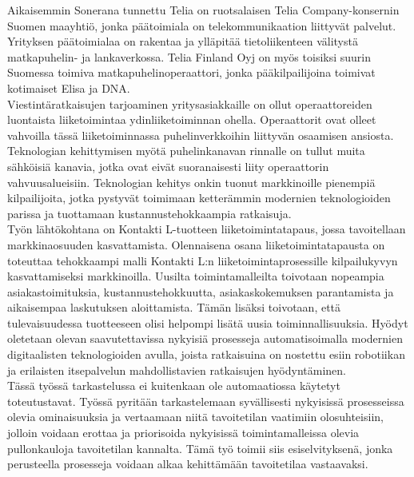 \documentclass[finnish,12pt,a4paper,pdftex]{article}
\begin{document}
Aikaisemmin Sonerana tunnettu Telia on ruotsalaisen Telia Company-konsernin Suomen maayhtiö, jonka päätoimiala on telekommunikaation liittyvät palvelut. Yrityksen päätoimialaa on rakentaa ja ylläpitää tietoliikenteen välitystä matkapuhelin- ja lankaverkossa. Telia Finland Oyj on myös toisiksi suurin Suomessa toimiva matkapuhelinoperaattori, jonka pääkilpailijoina toimivat kotimaiset Elisa ja DNA.\\

Viestintäratkaisujen tarjoaminen yritysasiakkaille on ollut operaattoreiden luontaista liiketoimintaa ydinliiketoiminnan ohella. Operaattorit ovat olleet vahvoilla tässä liiketoiminnassa puhelinverkkoihin liittyvän osaamisen ansiosta. Teknologian kehittymisen myötä puhelinkanavan rinnalle on tullut muita sähköisiä kanavia, jotka ovat eivät suoranaisesti liity operaattorin vahvuusalueisiin. Teknologian kehitys onkin tuonut markkinoille pienempiä kilpailijoita, jotka pystyvät toimimaan ketterämmin modernien teknologioiden parissa ja tuottamaan kustannustehokkaampia ratkaisuja.\\

Työn lähtökohtana on Kontakti L-tuotteen liiketoimintatapaus, jossa tavoitellaan markkinaosuuden kasvattamista. Olennaisena osana liiketoimintatapausta on toteuttaa tehokkaampi malli Kontakti L:n liiketoimintaprosessille kilpailukyvyn kasvattamiseksi markkinoilla. Uusilta toimintamalleilta toivotaan nopeampia asiakastoimituksia, kustannustehokkuutta, asiakaskokemuksen parantamista ja aikaisempaa laskutuksen aloittamista. Tämän lisäksi toivotaan, että tulevaisuudessa tuotteeseen olisi helpompi lisätä uusia toiminnallisuuksia. Hyödyt oletetaan olevan saavutettavissa nykyisiä prosesseja automatisoimalla modernien digitaalisten teknologioiden avulla, joista ratkaisuina on nostettu esiin robotiikan ja erilaisten itsepalvelun mahdollistavien ratkaisujen hyödyntäminen.\\

Tässä työssä tarkastelussa ei kuitenkaan ole automaatiossa käytetyt toteutustavat. Työssä pyritään tarkastelemaan syvällisesti nykyisissä prosesseissa olevia ominaisuuksia ja vertaamaan niitä tavoitetilan vaatimiin olosuhteisiin, jolloin voidaan erottaa ja priorisoida nykyisissä toimintamalleissa olevia pullonkauloja tavoitetilan kannalta. Tämä työ toimii siis esiselvityksenä, jonka perusteella prosesseja voidaan alkaa kehittämään tavoitetilaa vastaavaksi.\\
\end{document}

